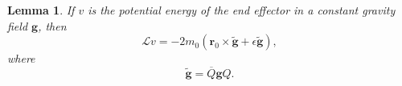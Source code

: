 \documentclass[reqno,12pt]{amsart}
\newcommand{\liederiv}{\mathcal L}
\newtheorem{lemma}{Lemma}
\begin{document}

\begin{lemma}
\label{lambda pot energy}
If $v$ is the potential energy of the end effector in a constant gravity field $\bm g$, then
\begin{equation}
\liederiv v = - 2 m_0 (\bm r_0 \times \tilde{\bm g} + \epsilon \tilde{\bm g}) ,
\end{equation}
where
\begin{equation}
\tilde{\bm g} = \overline Q \bm g Q .
\end{equation}
\end{lemma}
\end{document}
